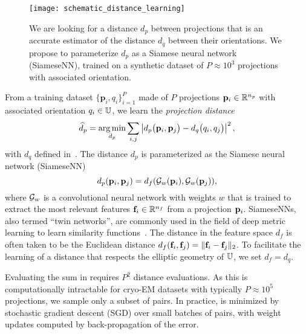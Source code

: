 \begin{figure}
    \centering
    \texttt{[image: schematic\_distance\_learning]}
    \caption{
        We are looking for a distance $d_p$ between projections that is an accurate estimator of the distance $d_q$ between their orientations.
        We propose to parameterize $d_p$ as a Siamese neural network (SiameseNN), trained on a synthetic dataset of $P \approx 10^3$ projections with associated orientation.
}
    \label{fig:schematic:distance-learning}
\end{figure}

From a training dataset $\{ \mathbf{p}_{i}, q_i\}_{i=1}^{P}$ made of $P$ projections $\mathbf{p}_i \in \mathbb{R}^{n_p}$ with associated orientation $q_i \in \mathbb{U}$, we learn the \textit{projection distance}
\begin{equation}
    \widehat{d}_p = \operatorname*{arg\,min}_{d_p} \sum_{i,j} \left| d_p\big(\mathbf{p}_{i},\mathbf{p}_{j}\big) - d_q\big(q_i,q_j\big) \right|^2,
    \label{eqn:distance-learning}
\end{equation}
with $d_q$ defined in~.
The distance $d_p$ is parameterized as the Siamese neural network (SiameseNN)~\cite{chopra2005learning}
\begin{equation}
    d_p(\mathbf{p}_i, \mathbf{p}_j) = d_f(\mathcal{G}_w(\mathbf{p}_i), \mathcal{G}_w(\mathbf{p}_j)),
    \label{eqn:distance:projections}
\end{equation}
where $\mathcal{G}_w$ is a convolutional neural network with weights $w$ that is trained to extract the most relevant features $\mathbf{f}_i \in \mathbb{R}^{n_f}$ from a projection $\mathbf{p}_i$. SiameseNNs, also termed ``twin networks'', are commonly used in the field of deep metric learning to learn similarity functions~\cite{yi2014deep}.
The distance in the feature space $d_f$ is often taken to be the Euclidean distance $d_f(\mathbf{f}_i, \mathbf{f}_j) = \Vert \mathbf{f}_i - \mathbf{f}_j \Vert_2$.
To facilitate the learning of a distance that respects the elliptic geometry of $\mathbb{U}$, we set $d_f = d_q$.


Evaluating the sum in  requires $P^2$ distance evaluations.
As this is computationally intractable for cryo-EM datasets with typically $P \approx 10^5$ projections, we sample only a subset of pairs.
In practice,  is minimized by stochastic gradient descent (SGD) over small batches of pairs, with weight updates computed by back-propagation of the error.

